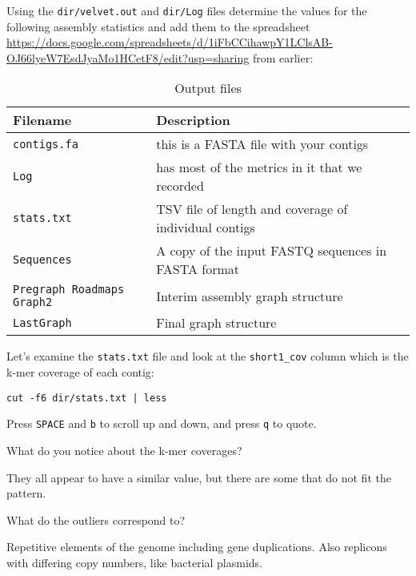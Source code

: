 Using the \texttt{dir/velvet.out} and \texttt{dir/Log} files determine the values for the following assembly statistics and add them to the spreadsheet \url{https://docs.google.com/spreadsheets/d/1iFbCCihawpY1LClsAB-OJ66lyeW7EsdJyaMo1HCetF8/edit?usp=sharing} from earlier:
\begin{table}[H]
  \centering
  \caption{Output files}
    \begin{tabular}{ll}
    \toprule
    \textbf{Filename} & \textbf{Description} \\
    \midrule
    \texttt{contigs.fa} & this is a FASTA file with your contigs \\
    \texttt{Log} & has most of the metrics in it that we recorded \\
	  \texttt{stats.txt} & TSV file of length and coverage of individual contigs \\
	  \texttt{Sequences} & A copy of the input FASTQ sequences in FASTA format \\
	  \texttt{Pregraph Roadmaps Graph2} & Interim assembly graph structure \\
	  \texttt{LastGraph} & Final graph structure \\
    \bottomrule
    \end{tabular}
  \label{tab:velvet_out}
\end{table}

\begin{steps}

Let's examine the \texttt{stats.txt} file and look at the \texttt{short1\_cov}
column which is the k-mer coverage of each contig:
\begin{lstlisting}
cut -f6 dir/stats.txt | less
\end{lstlisting}
Press \texttt{SPACE} and \texttt{b} to scroll up and down, and press \texttt{q} to quote.
\end{steps}

\begin{questions}
What do you notice about the k-mer coverages? \\
\begin{answer}
They all appear to have a similar value, but there are some that
do not fit the pattern.
\end{answer}
What do the outliers correspond to? \\
\begin{answer}
Repetitive elements of the genome including gene duplications.
Also replicons with differing copy numbers, like bacterial plasmids.
\end{answer}
\end{questions}

